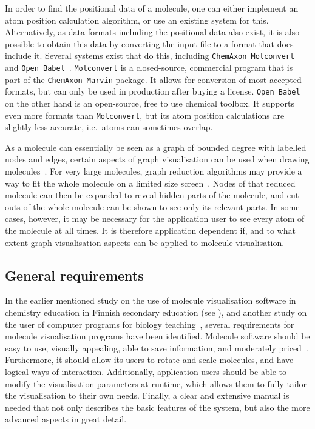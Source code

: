 In order to find the positional data of a molecule, one can either implement an atom position calculation algorithm, or use an existing system for this. Alternatively, as data formats including the positional data also exist, it is also possible to obtain this data by converting the input file to a format that does include it. Several systems exist that do this, including \verb|ChemAxon Molconvert|~\cite{chemaxon2014molecule} and \verb|Open Babel|~\cite{oboyle2011open}. \verb|Molconvert| is a closed-source, commercial program that is part of the \verb|ChemAxon Marvin| package. It allows for conversion of most accepted formats, but can only be used in production after buying a license. \verb|Open Babel| on the other hand is an open-source, free to use chemical toolbox. It supports even more formats than \verb|Molconvert|, but its atom position calculations are slightly less accurate, i.e.\ atoms can sometimes overlap.

As a molecule can essentially be seen as a graph of bounded degree with labelled nodes and edges, certain aspects of graph visualisation can be used when drawing molecules~\cite{boissonnat2001structure}. For very large molecules, graph reduction algorithms may provide a way to fit the whole molecule on a limited size screen~\cite{batagelj2004pajek}. Nodes of that reduced molecule can then be expanded to reveal hidden parts of the molecule, and cut-outs of the whole molecule can be shown to see only its relevant parts. In some cases, however, it may be necessary for the application user to see every atom of the molecule at all times. It is therefore application dependent if, and to what extent graph visualisation aspects can be applied to molecule visualisation.


\subsection{General requirements}
In the earlier mentioned study on the use of molecule visualisation software in chemistry education in Finnish secondary education (see ), and another study on the user of computer programs for biology teaching~\cite{taylor2013interface}, several requirements for molecule visualisation programs have been identified. Molecule software should be easy to use, visually appealing, able to save information, and moderately priced~\cite{aksela2008computer}. Furthermore, it should allow its users to rotate and scale molecules, and have logical ways of interaction. Additionally, application users should be able to modify the visualisation parameters at runtime, which allows them to fully tailor the visualisation to their own needs. Finally, a clear and extensive manual is needed that not only describes the basic features of the system, but also the more advanced aspects in great detail.




